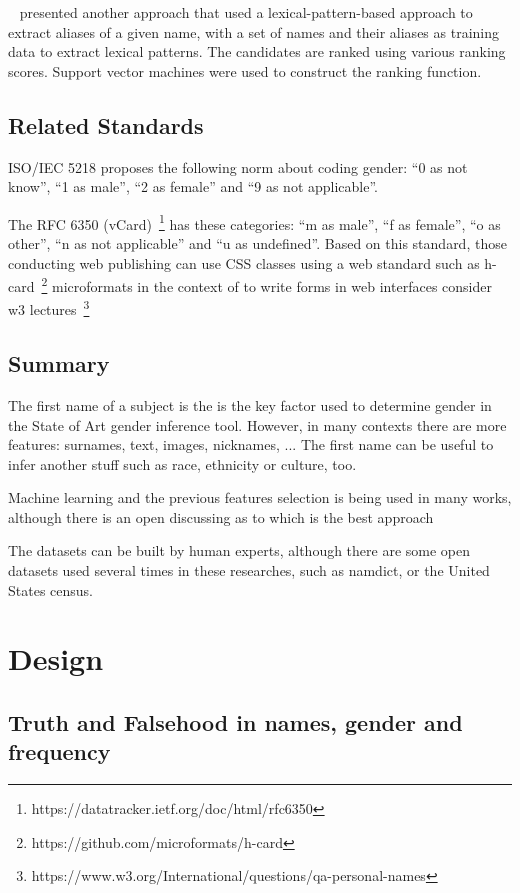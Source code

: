 \documentclass[a4paper]{article}
\begin{document}
~\cite{bollegala2010automatic} presented another approach that
used a lexical-pattern-based approach to extract aliases of a
given name, with a set of names and their aliases as training
data to extract lexical patterns. The candidates are ranked
using various ranking scores. Support vector machines were
used to construct the ranking function.

\subsection{Related Standards}

ISO/IEC 5218 proposes the following norm about coding
gender: ``0 as not know'', ``1 as male'', ``2 as female''
and ``9 as not applicable''.

The RFC 6350
(vCard)~\footnote{https://datatracker.ietf.org/doc/html/rfc6350}
has these categories: ``m as male'', ``f as
female'', ``o as other'', ``n as not applicable'' and ``u as
undefined''. Based on this standard, those conducting web
publishing can use CSS classes using a web standard such as
h-card~\footnote{https://github.com/microformats/h-card}
microformats in the context of to write forms in web interfaces
consider w3 lectures~\footnote{https://www.w3.org/International/questions/qa-personal-names}

\subsection{Summary}

The first name of a subject is the is the key factor used to
determine gender in the State of Art gender inference tool.
However, in many contexts there are more features: surnames,
text, images, nicknames, ... The first name can be useful to
infer another stuff such as race, ethnicity or culture, too.

Machine learning and the previous features selection is being
used in many works, although there is an open discussing as
to which is the best approach

The datasets can be built by human experts, although there are
some open datasets used several times in these researches, such as
namdict, or the United States census.

\section{Design}
\label{sec:design}

\subsection{Truth and Falsehood in names, gender and frequency}
\label{sec:truthandfalsehood}
\end{document}
